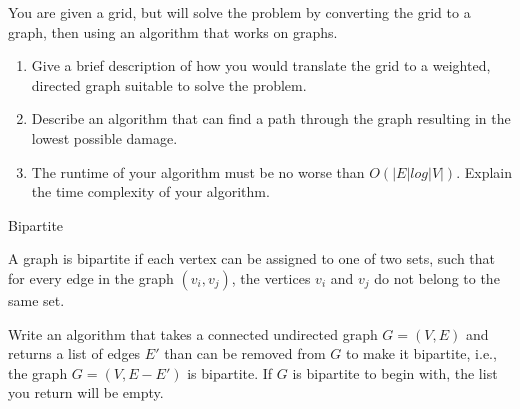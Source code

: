 \documentclass[10pt]{article}
\begin{document}
You are given a grid, but will solve the problem by converting the grid to a graph, then using an algorithm that works on graphs.
\begin{enumerate}
    \item Give a brief description of how you would translate the grid to a weighted, directed graph suitable to solve the problem. 
    \solution{ 
    }

    \item Describe an algorithm that can find a path through the graph resulting in the lowest possible damage. 
    \solution{ 
    }

    \item The runtime of your algorithm must be no worse than $O(|E| log |V|)$. Explain the time complexity of your algorithm.
    \solution{ 
    }

\end{enumerate}

\begin{problem} Bipartite \end{problem}

A graph is bipartite if each vertex can be assigned to one of two sets, such that for every edge in the graph $(v_i,v_j)$, the vertices $v_i$ and $v_j$ do not belong to the same set. 

Write an algorithm that takes a connected undirected graph $G = (V,E)$ and returns a list of edges $E'$ than can be removed from $G$ to make it bipartite, i.e., the graph $G = (V, E-E')$ is bipartite. If $G$ is bipartite to begin with, the list you return will be empty.

\solution{
}
\end{document}
